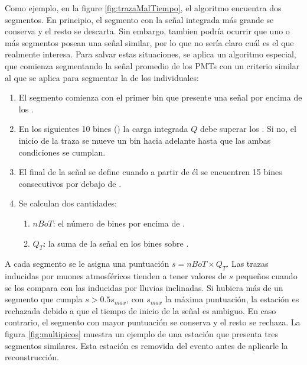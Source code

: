 		Como ejemplo, en la figure \ref{fig:trazaMalTiempo}, el algoritmo encuentra dos segmentos.
		En principio, el segmento con la señal integrada más grande se conserva y el resto se descarta.
		Sin embargo, tambien podría ocurrir que uno o más segmentos posean una señal similar, por lo que no sería claro cuál es el que realmente interesa.
		Para salvar estas situaciones, se aplica un algoritmo especial, que comienza segmentando la señal promedio de los PMTs con un criterio similar al que se aplica para segmentar la de los individuales:
		\begin{enumerate}
		 \item El segmento comienza con el primer bin que presente una señal por encima de los .
		 \item En los siguientes 10 bines () la carga integrada $Q$ debe superar los . Si no, el inicio de la traza se mueve un bin hacia adelante hasta que las ambas condiciones se cumplan.
		 \item El final de la señal se define cuando a partir de él se encuentren 15 bines consecutivos por debajo de .
		 \item Se calculan dos cantidades:
		 \begin{enumerate}
		  \item $nBoT$: el número de bines por encima de .
		  \item $Q_T$: la suma de la señal en los bines sobre .
		 \end{enumerate}
		\end{enumerate}
		A cada segmento se le asigna una puntuación $s=nBoT\times Q_T$. 
		Las trazas inducidas por muones atmosféricos tienden a tener valores de $s$ pequeños cuando se los compara con las inducidas por lluvias inclinadas.
		Si hubiera más de un segmento que cumpla $s>0.5s_{max}$, con $s_{max}$ la máxima puntuación, la estación es rechazada debido a que el tiempo de inicio de la señal es ambiguo.
		En caso contrario, el segmento con mayor puntuación se conserva y el resto se rechaza.
		La figura \ref{fig:multipicos} muestra un ejemplo de una estación que presenta tres segmentos similares. Esta estación es removida del evento antes de aplicarle la reconstrucción.
